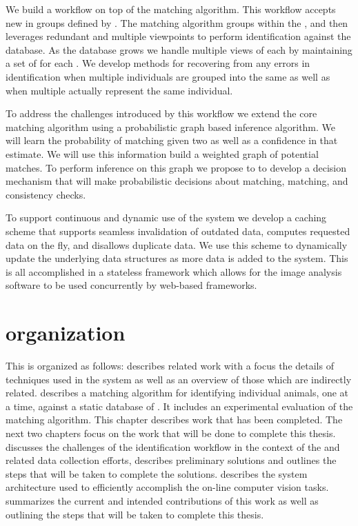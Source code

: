     We build a workflow on top of the matching algorithm.
    This workflow accepts new \annots{} in groups defined by \occurrences{}.
    The matching algorithm groups \annots{} within the \occurrence{}, and
      then leverages redundant and multiple viewpoints to perform identification
      against the database.
    As the database grows we handle multiple views of each \exemplar{} by
      maintaining a set of \exemplars{} for each \mastername{}.
    We develop methods for recovering from any errors in identification when
      multiple individuals are grouped into the same \exemplar{} as well as when
      multiple \exemplars{} actually represent the same individual.

    To address the challenges introduced by this workflow we extend the core
      matching algorithm using a probabilistic graph based inference algorithm.
    We will learn the probability of matching given two \annots{} as well as a
      confidence in that estimate.
    We will use this information build a weighted graph of potential matches.
    To perform inference on this graph we propose to to develop a decision
      mechanism that will make probabilistic decisions about \intraoccurrence{}
      matching, \vsexemplar{} matching, and consistency checks.

    To support continuous and dynamic use of the system we develop a caching
      scheme that supports seamless invalidation of outdated data, computes
      requested data on the fly, and disallows duplicate data.
    We use this scheme to dynamically update the underlying data structures as
      more data is added to the system.
    This is all accomplished in a stateless framework which allows for the
      image analysis software to be used concurrently by web-based frameworks.

\section{\Thesis{} organization} %
    This \thesis{} is organized as follows:
     describes related work with a focus the details of
      techniques used in the system as well as an overview of those which are
      indirectly related.
     describes a matching algorithm for identifying
      individual animals, one \annot{} at a time, against a static database of
      \exemplars{}.
    It includes an experimental evaluation of the matching algorithm.
    This chapter describes work that has been completed.
    The next two chapters focus on the work that will be done to complete this
      thesis.
     discusses the challenges of the identification
      workflow in the context of the \GZC{} and related data collection efforts,
      describes preliminary solutions and outlines the steps that will be taken
      to complete the solutions.
     describes the system architecture used to efficiently
      accomplish the on-line computer vision tasks.
     summarizes the current and intended contributions
      of this work as well as outlining the steps that will
      be taken to complete this thesis.
